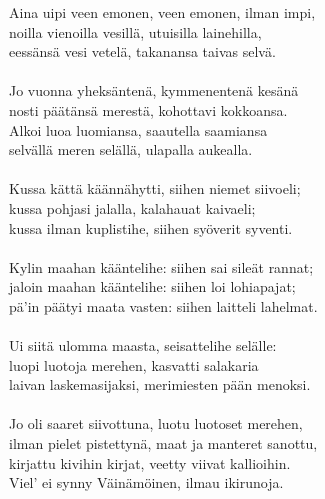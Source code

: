 Aina uipi veen emonen, veen emonen, ilman impi,             \\
noilla vienoilla vesillä, utuisilla lainehilla,             \\
eessänsä vesi vetelä, takanansa taivas selvä.               \\
                                                            \\
Jo vuonna yheksäntenä, kymmenentenä kesänä                  \\
nosti päätänsä merestä, kohottavi kokkoansa.                \\
Alkoi luoa luomiansa, saautella saamiansa                   \\
selvällä meren selällä, ulapalla aukealla.                  \\
                                                            \\
Kussa kättä käännähytti, siihen niemet siivoeli;            \\
kussa pohjasi jalalla, kalahauat kaivaeli;                  \\
kussa ilman kuplistihe, siihen syöverit syventi.            \\
                                                            \\
Kylin maahan kääntelihe: siihen sai sileät rannat;          \\
jaloin maahan kääntelihe: siihen loi lohiapajat;            \\
pä'in päätyi maata vasten: siihen laitteli lahelmat.        \\
                                                            \\
Ui siitä ulomma maasta, seisattelihe selälle:               \\
luopi luotoja merehen, kasvatti salakaria                   \\
laivan laskemasijaksi, merimiesten pään menoksi.            \\
                                                            \\
Jo oli saaret siivottuna, luotu luotoset merehen,           \\
ilman pielet pistettynä, maat ja manteret sanottu,          \\
kirjattu kivihin kirjat, veetty viivat kallioihin.          \\
Viel' ei synny Väinämöinen, ilmau ikirunoja.                \\
                                                            \\
